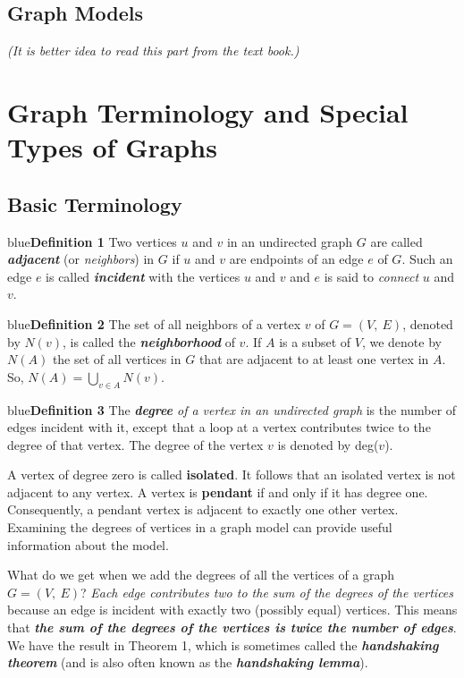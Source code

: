 \documentclass[11pt]{article}
\newenvironment{definition}[1]{\begin{mybox}{blue}{\textbf{Definition #1}}}{\end{mybox}}
\begin{document}
\subsection{Graph Models}

\textit{(It is better idea to read this part from the text book.)}


\section{Graph Terminology and Special Types of Graphs}

\subsection{Basic Terminology}

\begin{definition}{1}
Two vertices $u$ and $v$ in an undirected graph $G$ are called \textit{\textbf{adjacent}} (or \textit{neighbors}) in $G$ if $u$ and $v$ are endpoints of an edge $e$ of $G$. Such an edge $e$ is called \textit{\textbf{incident}} with the vertices $u$ and $v$ and $e$ is said to \textit{connect} $u$ and $v$.
\end{definition}

\begin{definition}{2}
The set of all neighbors of a vertex $v$ of $G = (V,\ E)$, denoted by $N(v)$, is called the \textit{\textbf{neighborhood}} of $v$. If $A$ is a subset of $V$, we denote by $N(A)$ the set of all vertices in $G$ that are adjacent to at least one vertex in $A$. So, $N(A) = \bigcup_{v \in A} N(v)$.
\end{definition}

\begin{definition}{3}
The \textit{\textbf{degree} of a vertex in an undirected graph} is the number of edges incident with it, except that a loop at a vertex contributes twice to the degree of that vertex. The degree of the vertex $v$ is denoted by deg($v$).
\end{definition}

A vertex of degree zero is called \textbf{isolated}. It follows that an isolated vertex is not adjacent to any vertex. A vertex is \textbf{pendant} if and only
if it has degree one. Consequently, a pendant vertex is adjacent to exactly one other vertex. Examining the degrees of vertices in a graph model can provide useful information about the model.

What do we get when we add the degrees of all the vertices of a graph $G = (V,\ E)$? \textit{Each edge contributes two to the sum of the degrees of the vertices} because an edge is incident with exactly two (possibly equal) vertices. This means that \textit{\textbf{the sum of the degrees of the vertices is twice the number of edges}}. We have the result in Theorem 1, which is sometimes called the \textit{\textbf{handshaking theorem}} (and is also often known as the \textit{\textbf{handshaking lemma}}).
\end{document}
